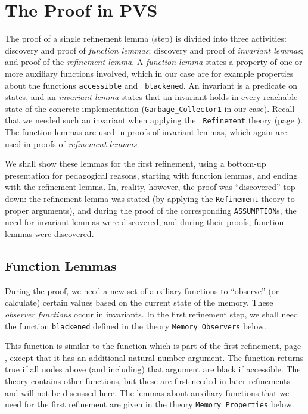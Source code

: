 
\section{The Proof in PVS}
\label{pvs-proof}

\noindent The proof of a single refinement lemma (step) is divided into 
three activities:   discovery   and proof of  {\em   function lemmas};
discovery and proof of {\em  invariant lemmas}; and  proof of the {\em
  refinement lemma}\@.  A {\em function lemma}  states a property of one
or more   auxiliary functions  involved,  which  in our case   are for
example  properties  about the  functions   {\tt accessible} and  {\tt
  blackened}\@.  An invariant  is  a predicate on  states,  and  an {\em
  invariant lemma} states that an  invariant holds in every  reachable
state of the concrete implementation ({\tt Garbage\_Collector1} in our
case)\@.  Recall that we needed such an invariant when applying the {\tt
  Refinement} theory   (page  \pageref{pvs-mappings})\@.  The   function
lemmas are used in proofs of invariant lemmas, which again are used in
proofs of {\em refinement lemmas}\@.

We shall show these lemmas for the first refinement, using a bottom-up
presentation for  pedagogical reasons, starting  with function lemmas,
and ending with the refinement lemma.  In, reality, however, the proof
was ``discovered''   top  down: the refinement   lemma  was stated (by
applying the {\tt Refinement} theory to  proper arguments), and during
the proof of   the  corresponding {\tt  ASSUMPTION}s,   the need  for
invariant lemmas were   discovered, and during  their proofs, function
lemmas were discovered.


\subsection{Function Lemmas}

During  the proof,   we  need a new   set  of auxiliary  functions  to
``observe'' (or calculate)  certain values based  on the current state
of the memory.  These {\em observer functions} occur in invariants.  In
the first refinement step, we shall need  the function {\tt blackened}
defined  in   the     theory {\tt  Memory\_Observers} below.

This function is  similar to the function  which is part  of the first
refinement, page \pageref{pvs-coloured-memory}, except  that it has an
additional natural number argument.   The function returns true if all
nodes above (and including) that argument are black if accessible.  The
theory contains other  functions, but these  are first needed in later
refinements and  will  not  be  discussed   here.  The   lemmas  about
auxiliary functions that we need for the first refinement are given in
the theory {\tt Memory\_Properties} below.

